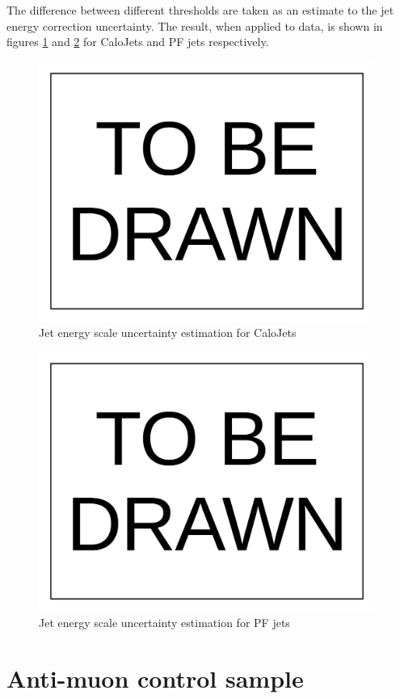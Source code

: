 \documentclass[10pt,a4paper,onecolumn]{article}
\begin{document}
The difference between different thresholds are taken as an estimate to the jet energy correction uncertainty.
The result, when applied to data, is shown in figures \ref{Figure_CaloJetJES} and \ref{Figure_PFJetJES} for CaloJets and PF jets respectively.

\begin{figure}
\includegraphics[width=110mm]{ToBeDrawn.pdf}
\caption{Jet energy scale uncertainty estimation for CaloJets}
\label{Figure_CaloJetJES}
\end{figure}

\begin{figure}
\includegraphics[width=110mm]{ToBeDrawn.pdf}
\caption{Jet energy scale uncertainty estimation for PF jets}
\label{Figure_PFJetJES}
\end{figure}


\section{Anti-muon control sample}
\end{document}
